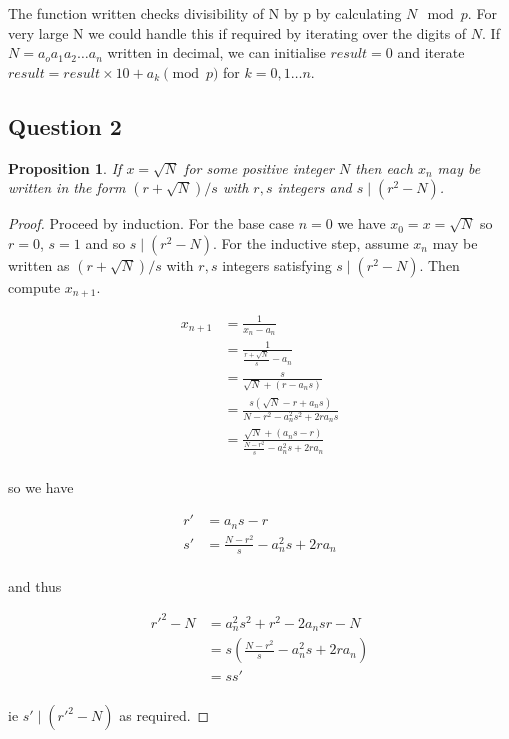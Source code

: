 \documentclass[10pt,a4paper]{report}
\newtheorem*{prop}{Proposition}
\begin{document}
The function written checks divisibility of N by p by calculating $N \mod p$. For very large N we could handle this if required by iterating over the digits of $N$. If $N=a_oa_1a_2\dots a_n$ written in decimal, we can initialise $result=0$ and iterate $result=result\times10+a_k\pmod p$ for $k=0,1\dots n$.	

\subsection*{Question 2}

\begin{prop}
If $x =\sqrt{N}$ for some positive integer $N$ then each $x_n$ may be written in the form $(r +\sqrt{N})/s$ with $r, s$ integers and $s \mid (r^
2 - N)$.
\end{prop}

\begin{proof}

Proceed by induction. For the base case $n=0$ we have $x_0=x=\sqrt{N}$ so $r=0$, $s=1$ and so $s \mid (r^2 - N)$. For the inductive step, assume $x_n$ may be written as $(r +\sqrt{N})/s$ with $r,s$ integers satisfying $s \mid (r^2 - N)$. Then compute $x_{n+1}$. 

\begin{align*}
x_{n+1} &= \frac{1}{x_n-a_n}\\
		&= \frac{1}{\frac{r+\sqrt{N}}{s}-a_n}\\
		&= \frac{s}{\sqrt{N}+(r-a_ns)}\\
		&= \frac{s(\sqrt{N}-r+a_ns)}{N-r^2-a_n^2s^2+2ra_ns}\\
		&= \frac{\sqrt{N}+(a_ns-r)}{\frac{N-r^2}{s}-a_n^2s+2ra_n}\\
\end{align*}

so we have 

\begin{align*}
r' &= a_ns-r\\
s'	&= \frac{N-r^2}{s}-a_n^2s+2ra_n\\
\end{align*}

and thus 

\begin{align*}
r'^2-N &= a_n^2s^2+r^2-2a_nsr-N\\
	&= s(\frac{N-r^2}{s}-a_n^2s+2ra_n)\\
	&= ss'\\
\end{align*}

ie $s' \mid (r'^2 - N)$ as required.

\end{proof}
\end{document}
